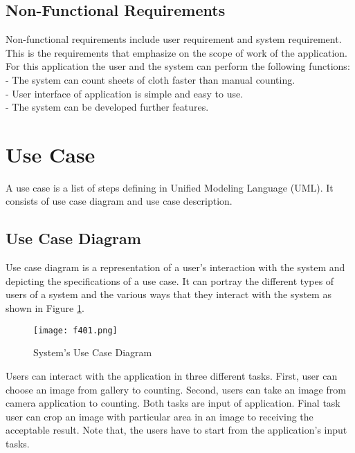 \subsection{Non-Functional Requirements}
Non-functional requirements include user requirement and system requirement. This is the requirements that emphasize on the scope of work of the application. 
For this application the user and the system can perform the following functions:\\
- The system can count sheets of cloth faster than manual counting.\\
- User interface of application is simple and easy to use.\\
- The system can be developed further features.\\
\section{Use Case}
A use case is a list of steps defining in Unified Modeling Language (UML). It consists of use case diagram and use case description.

\subsection{Use Case Diagram}
Use case diagram is a representation of a user's interaction with the system and depicting the specifications of a use case. It can portray the different types of users of a system and the various ways that they interact with the system as shown in Figure \ref{fig:f401}.
\begin{figure}[t]
	\centering
	\texttt{[image: f401.png]}
	\caption{System’s Use Case Diagram}
	\label{fig:f401}
\end{figure}

Users can interact with the application in three different tasks. First, user can choose an image from gallery to counting. Second, users can take an image from camera application to counting. Both tasks are input of application. Final task user can crop an image with particular area in an image to receiving the acceptable result. Note that, the users have to start from the application's input tasks.
